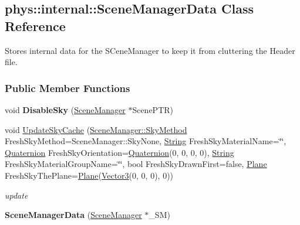 \hypertarget{classphys_1_1internal_1_1SceneManagerData}{
\subsection{phys::internal::SceneManagerData Class Reference}
\label{d7/dbb/classphys_1_1internal_1_1SceneManagerData}
}


Stores internal data for the SCeneManager to keep it from cluttering the Header file.  


\subsubsection*{Public Member Functions}
\begin{DoxyCompactItemize}
\item 
\hypertarget{classphys_1_1internal_1_1SceneManagerData_a40d62405f637531b7fd19b6c176c5a50}{
void {\bfseries DisableSky} (\hyperlink{classphys_1_1SceneManager}{SceneManager} $\ast$ScenePTR)}
\label{d7/dbb/classphys_1_1internal_1_1SceneManagerData_a40d62405f637531b7fd19b6c176c5a50}

\item 
\hypertarget{classphys_1_1internal_1_1SceneManagerData_a0e4db14de622e028e5bea383d37099ed}{
void \hyperlink{classphys_1_1internal_1_1SceneManagerData_a0e4db14de622e028e5bea383d37099ed}{UpdateSkyCache} (\hyperlink{classphys_1_1SceneManager_a91dd086aabaab926d070c65fc14828d6}{SceneManager::SkyMethod} FreshSkyMethod=SceneManager::SkyNone, \hyperlink{namespacephys_aa03900411993de7fbfec4789bc1d392e}{String} FreshSkyMaterialName=\char`\"{}\char`\"{}, \hyperlink{classphys_1_1Quaternion}{Quaternion} FreshSkyOrientation=\hyperlink{classphys_1_1Quaternion}{Quaternion}(0, 0, 0, 0), \hyperlink{namespacephys_aa03900411993de7fbfec4789bc1d392e}{String} FreshSkyMaterialGroupName=\char`\"{}\char`\"{}, bool FreshSkyDrawnFirst=false, \hyperlink{classphys_1_1Plane}{Plane} FreshSkyThePlane=\hyperlink{classphys_1_1Plane}{Plane}(\hyperlink{classphys_1_1Vector3}{Vector3}(0, 0, 0), 0))}
\label{d7/dbb/classphys_1_1internal_1_1SceneManagerData_a0e4db14de622e028e5bea383d37099ed}

\begin{DoxyCompactList}\small\item\em update \item\end{DoxyCompactList}\item 
\hypertarget{classphys_1_1internal_1_1SceneManagerData_aedd570da5bdb027ec976e3c29137474c}{
{\bfseries SceneManagerData} (\hyperlink{classphys_1_1SceneManager}{SceneManager} $\ast$\_\-SM)}
\label{d7/dbb/classphys_1_1internal_1_1SceneManagerData_aedd570da5bdb027ec976e3c29137474c}

\end{DoxyCompactItemize}
